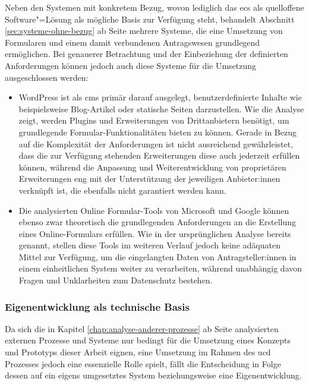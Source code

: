 \documentclass[a4paper,12pt,twoside,numbers=noendperiod]{scrreprt}
\begin{document}
Neben den Systemen mit konkretem Bezug, wovon lediglich das \ac{ecs} als quelloffene Software"=Lösung als mögliche Basis zur Verfügung steht, behandelt Abschnitt \ref{sec:systeme-ohne-bezug} ab Seite \pageref{sec:systeme-ohne-bezug} mehrere Systeme, die eine Umsetzung von Formularen und einem damit verbundenen Antragswesen grundlegend ermöglichen. Bei genauerer Betrachtung und der Einbeziehung der definierten Anforderungen können jedoch auch diese Systeme für die Umsetzung ausgeschlossen werden:
\begin{itemize}
    \item WordPress ist als \ac{cms} primär darauf ausgelegt, benutzerdefinierte Inhalte wie beispielsweise Blog-Artikel oder statische Seiten darzustellen. Wie die Analyse zeigt, werden Plugins und Erweiterungen von Drittanbietern benötigt, um grundlegende Formular-Funktionalitäten bieten zu können. Gerade in Bezug auf die Komplexität der Anforderungen ist nicht ausreichend gewährleistet, dass die zur Verfügung stehenden Erweiterungen diese auch jederzeit erfüllen können, während die Anpassung und Weiterentwicklung von proprietären Erweiterungen eng mit der Unterstützung der jeweiligen Anbieter:innen verknüpft ist, die ebenfalls nicht garantiert werden kann.
    \item Die analysierten Online Formular-Tools von Microsoft und Google können ebenso zwar theoretisch die grundlegenden Anforderungen an die Erstellung eines Online-Formulars erfüllen. Wie in der ursprünglichen Analyse bereits genannt, stellen diese Tools im weiteren Verlauf jedoch keine adäquaten Mittel zur Verfügung, um die eingelangten Daten von Antragsteller:innen in einem einheitlichen System weiter zu verarbeiten, während unabhängig davon Fragen und Unklarheiten zum Datenschutz bestehen.
\end{itemize}

\subsubsection*{Eigenentwicklung als technische Basis}
\label{sub-sub-sec:technische-basis-eigenentwicklung}

Da sich die in Kapitel \ref{chap:analyse-anderer-prozesse} ab Seite \pageref{chap:analyse-anderer-prozesse} analysierten externen Prozesse und Systeme nur bedingt für die Umsetzung eines Konzepts und Prototyps dieser Arbeit eignen, eine Umsetzung im Rahmen des \acl{ucd} Prozesses jedoch eine essenzielle Rolle spielt, fällt die Entscheidung in Folge dessen auf ein eigens umgesetztes System beziehungsweise eine Eigenentwicklung.
\end{document}
